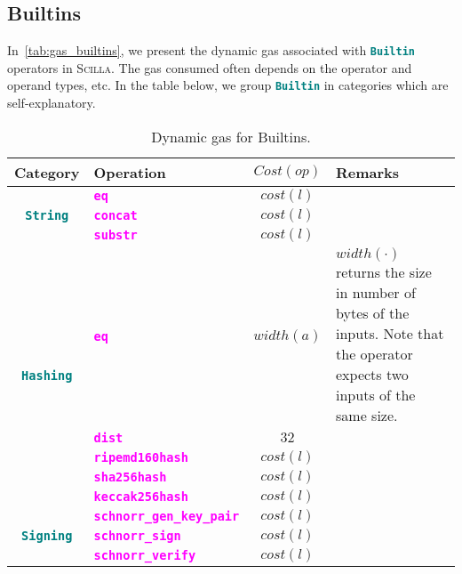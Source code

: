 \documentclass[9pt]{article}
\begin{document}
\subsection{Builtins}

In~\autoref{tab:gas_builtins}, we present the dynamic gas associated with
\textbf{\texttt{\textcolor{teal}{Builtin}}} operators in \textsc{Scilla}. The
gas consumed often depends on the operator and operand types, etc. In the table
below, we group \textbf{\texttt{\textcolor{teal}{Builtin}}} in categories which
are self-explanatory.

\begin{table}[!hbt]
	\caption{Dynamic gas for  Builtins. \label{tab:gas_builtins} }
\centering
	\begin{tabular}{|c|p{4.1cm}|c|p{5cm}|}
	\hline
		\textbf{Category} & \textbf{Operation} & \textbf{$Cost(op)$} & \textbf{Remarks} \\ \hline
		\multirow{3}{*}{\textbf{\texttt{\textcolor{teal}{String}}}} &
		\textbf{\texttt{\textcolor{magenta}{eq}}} & $cost(l)$  & \\
		\cline{2-4}
		 & \texttt{\textbf{\textcolor{magenta}{concat}}} & $cost(l)$  & \\ \cline{2-4}
		 & \textbf{\texttt{\textcolor{magenta}{substr}}} & $cost(l)$  & \\ \hline \hline
		\multirow{5}{*}{\textbf{\texttt{\textcolor{teal}{Hashing}}}} &
		  \textbf{\texttt{\textcolor{magenta}{eq}}} & $ width(a) $  & $width(\cdot)$
		  returns the size in number of bytes of the inputs. Note that the
		  operator expects two inputs of the same size.  \\ \cline{2-4}
		 & \textbf{\texttt{\textcolor{magenta}{dist}}} & $32$  & \\ \cline{2-4}
		 & \textbf{\texttt{\textcolor{magenta}{ripemd160hash}}} & $cost(l)$  & \\
		\cline{2-4}
		 & \textbf{\texttt{\textcolor{magenta}{sha256hash}}} & $cost(l)$  & \\ \cline{2-4}
		 & \textbf{\texttt{\textcolor{magenta}{keccak256hash}}} & $cost(l)$  & \\ \hline
		 \hline
		\multirow{4}{*}{\textbf{\texttt{\textcolor{teal}{Signing}}}} &
		\textbf{\texttt{\textcolor{magenta}{schnorr\_gen\_key\_pair}}} & $cost(l)$  & \\
		\cline{2-4}
		 & \textbf{\texttt{\textcolor{magenta}{schnorr\_sign}}} & $cost(l)$  & \\ \cline{2-4}
		 & \textbf{\texttt{\textcolor{magenta}{schnorr\_verify}}} & $cost(l)$  & \\

\end{tabular}
\end{table}
\end{document}
